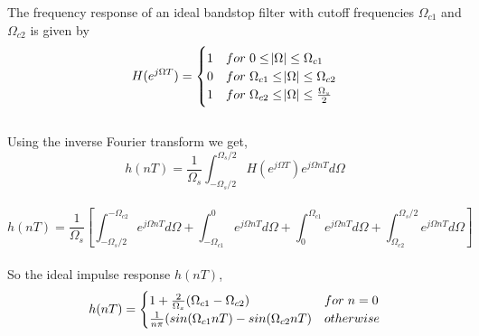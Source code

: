 \documentclass[11pt]{article}
\begin{document}
\justify
    The frequency response of an ideal bandstop filter with cutoff frequencies $\Omega_{c1}$ and $\Omega_{c2}$ is given by\\
    \[
     H(e^{j\Omega T}) = \begin{cases}
     1 & for \hspace*{3pt} 0 \leq \abs{\Omega} \leq \Omega_{c1} \\
     0 & for \hspace*{3pt} \Omega_{c1} \leq \abs{\Omega} \leq \Omega_{c2} \\
     1 & for \hspace*{3pt} \Omega_{c2} \leq \abs{\Omega} \leq \frac{\Omega_s}{2}
    \end{cases}
    \]\\
    Using the inverse Fourier transform we get,\\
    $$h(nT) = \frac{1}{\Omega_s}\int_{-\Omega_s/2}^{\Omega_s/2}H(e^{j\Omega T})e^{j\Omega nT}d\Omega$$\\
    \vspace*{-20pt}
    $$h(nT) = \frac{1}{\Omega_s}\left[\int_{-\Omega_s/2}^{-\Omega_{c2}}e^{j\Omega nT}d\Omega+\int_{-\Omega_{c1}}^{0}e^{j\Omega nT}d\Omega+\int_{0}^{\Omega_{c1}}e^{j\Omega nT}d\Omega+\int_{\Omega_{c2}}^{\Omega_s/2}e^{j\Omega nT}d\Omega\right]$$\\
    So the ideal impulse response $h(nT)$,\\
    \[
     h(nT) = \begin{cases}
     1 + \frac{2}{\Omega_s}(\Omega_{c1}-\Omega_{c2}) & for \hspace*{3pt} n=0\\
     \frac{1}{n\pi}(sin(\Omega_{c1}nT) - sin(\Omega_{c2}nT) & otherwise
    \end{cases}
    \]\\
\end{document}

